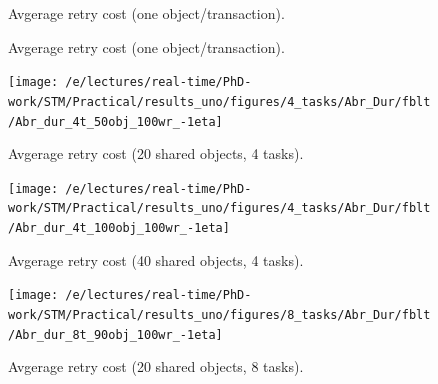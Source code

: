 \documentclass[a4paper,english]{article}
\begin{document}
\begin{figure}[!htpd]
\centering
{}
\caption{Avgerage retry cost (one object/transaction).}

\label{fig:fblt_results_uniobject}
\end{figure}\begin{figure}
\centering
{}
\caption{Avgerage retry cost (one object/transaction).}

\label{fig:fblt_results_uniobject}
\end{figure}


\begin{figure}[!htpd]
\centering
\texttt{[image: /e/lectures/real-time/PhD-work/STM/Practical/results\_uno/figures/4\_tasks/Abr\_Dur/fblt/Abr\_dur\_4t\_50obj\_100wr\_-1eta]}
\caption{Avgerage retry cost (20 shared objects, 4 tasks).}
\label{fig-RC-fblt-4t-20obj}
\end{figure}

\begin{figure}[!htpd]
\centering
\texttt{[image: /e/lectures/real-time/PhD-work/STM/Practical/results\_uno/figures/4\_tasks/Abr\_Dur/fblt/Abr\_dur\_4t\_100obj\_100wr\_-1eta]}
\caption{Avgerage retry cost (40 shared objects, 4 tasks).}
\label{fig-RC-fblt-4t-40obj}
\end{figure}

\begin{figure}[!htpd]
\centering
\texttt{[image: /e/lectures/real-time/PhD-work/STM/Practical/results\_uno/figures/8\_tasks/Abr\_Dur/fblt/Abr\_dur\_8t\_90obj\_100wr\_-1eta]}
\caption{Avgerage retry cost (20 shared objects, 8 tasks).}
\label{fig-RC-fblt-8t-20obj}
\end{figure}
\end{document}
